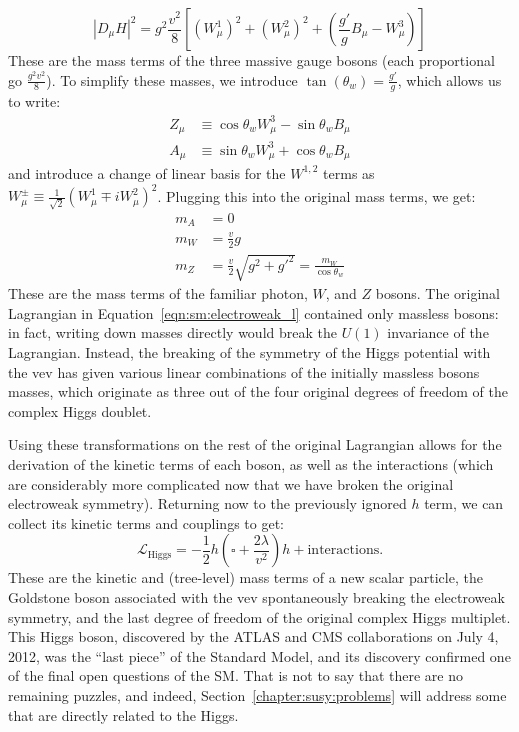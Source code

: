 %
\begin{equation}
|D_\mu H|^2 = g^2 \frac{v^2}{8} \left[ (W_\mu^1)^2 + (W_\mu^2)^2 + \left( \frac{g'}{g} B_\mu - W_\mu^3 \right) \right]
\end{equation}
%
These are the mass terms of the three massive gauge bosons (each proportional go $\frac{g^2 v^2}{8}$). To simplify these masses, we introduce $\tan(\theta_w) = \frac{g'}{g}$, which allows us to write:
%
\begin{align}
Z_\mu &\equiv \cos \theta_w W_\mu^3 - \sin \theta_w B_\mu\\
A_\mu &\equiv \sin \theta_w W_\mu^3 + \cos \theta_w B_\mu
\end{align}
%
and introduce a change of linear basis for the $W^{1,2}$ terms as $W_\mu^{\pm} \equiv \frac{1}{\sqrt{2}} (W_\mu^1 \mp i W_\mu^2)^2$. Plugging this into the original mass terms, we get:
%
\begin{align}
m_A &= 0\\
m_W &= \frac{v}{2} g\\
m_Z &= \frac{v}{2} \sqrt{g^2 +g'^2} = \frac{m_W}{\cos \theta_w}
\end{align}
%
These are the mass terms of the familiar photon, $W$, and $Z$ bosons. The original Lagrangian in Equation~\ref{eqn:sm:electroweak_l} contained only massless bosons: in fact, writing down masses directly would break the $U(1)$ invariance of the Lagrangian.  Instead, the breaking of the symmetry of the Higgs potential with the vev has given various linear combinations of the initially massless bosons masses, which originate as three out of the four original degrees of freedom of the complex Higgs doublet. 

Using these transformations on the rest of the original Lagrangian allows for the derivation of the kinetic terms of each boson, as well as the interactions (which are considerably more complicated now that we have broken the original electroweak symmetry). Returning now to the previously ignored $h$ term, we can collect its kinetic terms and couplings to get:
%
\begin{equation}
\mathcal{L}_\mathrm{Higgs} = - \frac{1}{2} h \left(\square + \frac{2\lambda}{v^2}\right) h + \mathrm{interactions}.
\end{equation}
%
These are the kinetic and (tree-level) mass terms of a new scalar particle, the Goldstone boson associated with the vev spontaneously breaking the electroweak symmetry, and the last degree of freedom of the original complex Higgs multiplet. This Higgs boson, discovered by the ATLAS and CMS collaborations on July 4, 2012, was the ``last piece'' of the Standard Model, and its discovery confirmed one of the final open questions of the SM. That is not to say that there are no remaining puzzles, and indeed, Section~\ref{chapter:susy:problems} will address some that are directly related to the Higgs.

